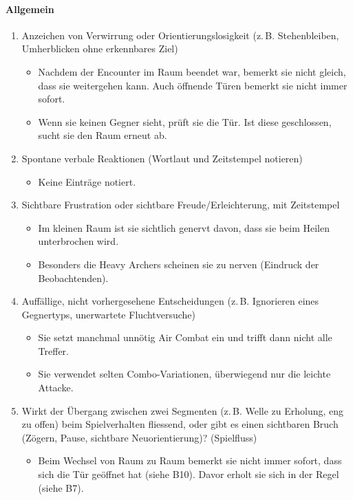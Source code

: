 \documentclass[../Main.tex]{subfiles}
\begin{document}
\paragraph{Allgemein}
\begin{enumerate}[label=\textbf{B\arabic*}, leftmargin=1.5cm, itemsep=0.8em, resume]
    \item Anzeichen von Verwirrung oder Orientierungslosigkeit (z.\,B. Stehenbleiben, Umherblicken ohne erkennbares Ziel)
    \begin{itemize}[nosep]
        \item Nachdem der Encounter im Raum beendet war, bemerkt sie nicht gleich, dass sie weitergehen kann. Auch öffnende Türen bemerkt sie nicht immer sofort.
        \item Wenn sie keinen Gegner sieht, prüft sie die Tür. Ist diese geschlossen, sucht sie den Raum erneut ab.
    \end{itemize}

    \item Spontane verbale Reaktionen (Wortlaut und Zeitstempel notieren)
    \begin{itemize}[nosep]
        \item Keine Einträge notiert.
    \end{itemize}

    \item Sichtbare Frustration oder sichtbare Freude/Erleichterung, mit Zeitstempel
    \begin{itemize}[nosep]
        \item Im kleinen Raum ist sie sichtlich genervt davon, dass sie beim Heilen unterbrochen wird.
        \item Besonders die Heavy Archers scheinen sie zu nerven (Eindruck der Beobachtenden).
    \end{itemize}

    \item Auffällige, nicht vorhergesehene Entscheidungen (z.\,B. Ignorieren eines Gegnertyps, unerwartete Fluchtversuche)
    \begin{itemize}[nosep]
        \item Sie setzt manchmal unnötig Air Combat ein und trifft dann nicht alle Treffer.
        \item Sie verwendet selten Combo-Variationen, überwiegend nur die leichte Attacke.
    \end{itemize}

    \item Wirkt der Übergang zwischen zwei Segmenten (z.\,B. Welle zu Erholung, eng zu offen) beim Spielverhalten fliessend, oder gibt es einen sichtbaren Bruch (Zögern, Pause, sichtbare Neuorientierung)? \hfill (Spielfluss)
    \begin{itemize}[nosep]
        \item Beim Wechsel von Raum zu Raum bemerkt sie nicht immer sofort, dass sich die Tür geöffnet hat (siehe B10). Davor erholt sie sich in der Regel (siehe B7).
    \end{itemize}
\end{enumerate}
\end{document}
